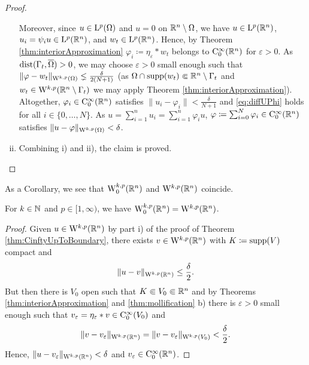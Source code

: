\begin{proof}
\begin{enumerate}[i)]
      Moreover, since $u \in \mathrm{L}^p(\Omega)$ and $u = 0$ on $\mathbb{R}^n \setminus \Omega$, we have $u \in \mathrm{L}^p(\mathbb{R}^n)$, $u_i = \psi_i u \in \mathrm{L}^p(\mathbb{R}^n)$, and $w_t \in \mathrm{L}^p(\mathbb{R}^n)$.
      Hence, by Theorem \ref{thm:interiorApproximation} $\varphi_i \coloneqq \eta_\varepsilon \ast w_t$ belongs to $\mathrm{C}_0^\infty(\mathbb{R}^n)$ for $\varepsilon > 0$.
      As $\operatorname{dist}(\Gamma_t , \overline\Omega) > 0$, we may choose $\varepsilon > 0$ small enough such that $\|\varphi - w_t \|_{\mathrm{W}^{k,p}(\Omega)} \lneq \frac{\delta}{2(N+1)}$ (as $\Omega \cap \operatorname{supp}(w_t) \Subset \mathbb{R}^n \setminus \Gamma_t$ and $w_t \in \mathrm{W}^{k,p}(\mathbb{R}^n \setminus \Gamma_t)$ we may apply Theorem \ref{thm:interiorApproximation}).
      Altogether, $\varphi_i \in \mathrm{C}_0^\infty(\mathbb{R}^n)$ satisfies $\|u_i - \varphi_i\| < \frac{\delta}{N + 1}$ and \eqref{eq:diffUPhi} holds for all $i \in \{0,\dots,N\}$.
      As $u = \sum_{i = 1}^n u_i = \sum_{i = 1}^n \varphi_i u$, $\varphi \coloneqq \sum_{i = 0}^N \varphi_i \in \mathrm{C}_0^\infty(\mathbb{R}^n)$ satisfies $\| u - \varphi \|_{\mathrm{W}^{k,p}(\Omega)} < \delta$.
    \item Combining i) and ii), the claim is proved.  \qedhere
  \end{enumerate}
\end{proof}

As a Corollary, we see that $\mathrm{W}_0^{k,p}(\mathbb{R}^n)$ and $\mathrm{W}^{k,p}(\mathbb{R}^n)$ coincide.

\begin{cor}
  For $k \in \mathbb{N}$ and $p \in [1,\infty)$, we have $\mathrm{W}_0^{k,p}(\mathbb{R}^n) = \mathrm{W}^{k,p}(\mathbb{R}^n)$.
\end{cor}

\begin{proof}
  Given $u \in \mathrm{W}^{k,p}(\mathbb{R}^n)$ by part i) of the proof of Theorem \ref{thm:CinftyUpToBoundary}, there exists $v \in\mathrm{W}^{k,p}(\mathbb{R}^n)$ with $K\coloneqq \operatorname{supp}(V)$ compact and $$\|u - v\|_{\mathrm{W}^{k,p}(\mathbb{R}^n)} \leq \frac{\delta}{2}.$$
  But then there is $V_0$ open such that $K \Subset V_0 \Subset \mathbb{R}^n$ and by Theorems \ref{thm:interiorApproximation} and \ref{thm:mollification} b) there is $\varepsilon > 0$ small enough such that $v_\varepsilon = \eta_\varepsilon \ast v \in \mathrm{C}_0^\infty(V_0)$ and 
  $$
  \|v - v_\varepsilon\|_{\mathrm{W}^{k,p}(\mathbb{R}^n)} = \|v - v_\varepsilon\|_{\mathrm{W}^{k,p}(V_0)} < \frac{\delta}{2}.
  $$
  Hence, $\|u - v_\varepsilon\|_{\mathrm{W}^{k,p}(\mathbb{R}^n)} < \delta$ and $v_\varepsilon \in \mathrm{C}_0^\infty(\mathbb{R}^n)$.
\end{proof}

